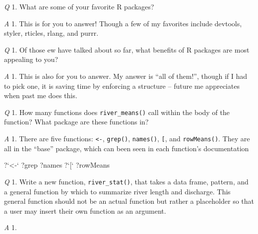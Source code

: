 \documentclass[
]{book}
\newenvironment{Shaded}{\begin{snugshade}}{\end{snugshade}}
\newcommand{\DataTypeTok}[1]{\textcolor[rgb]{0.13,0.29,0.53}{#1}}
\newcommand{\NormalTok}[1]{#1}
\newcommand{\StringTok}[1]{\textcolor[rgb]{0.31,0.60,0.02}{#1}}
\begin{document}
\emph{Q} 1. What are some of your favorite R packages?

\emph{A} 1. This is for you to answer! Though a few of my favorites include devtools, styler, rticles, rlang, and purrr.

\emph{Q} 1. Of those ew have talked about so far, what benefits of R packages are most appealing to you?

\emph{A} 1. This is also for you to answer. My answer is ``all of them!'', though if I had to pick one, it is saving time by enforcing a structure -- future me appreciates when past me does this.

\emph{Q} 1. How many functions does \texttt{river\_means()} call within the body of the function? What package are these functions in?

\emph{A} 1. There are five functions: \texttt{\textless{}-}, \texttt{grep()}, \texttt{names()}, \texttt{{[}}, and \texttt{rowMeans()}. They are all in the ``base'' package, which can been seen in each function's documentation

\begin{Shaded}
\begin{Highlighting}[]
\NormalTok{?}\StringTok{`}\DataTypeTok{<-}\StringTok{`}
\NormalTok{?grep}
\NormalTok{?names}
\NormalTok{?}\StringTok{`}\DataTypeTok{[}\StringTok{`}
\NormalTok{?rowMeans}
\end{Highlighting}
\end{Shaded}

\emph{Q} 1. Write a new function, \texttt{river\_stat()}, that takes a data frame, pattern, and a general function by which to summarize river length and discharge. This general function should not be an actual function but rather a placeholder so that a user may insert their own function as an argument.

\emph{A} 1.
\end{document}
